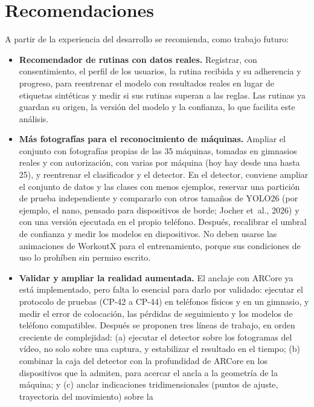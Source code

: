 \section{Recomendaciones}
\label{sec:recomendaciones}

A partir de la experiencia del desarrollo se recomienda, como trabajo futuro:

\begin{itemize}
    \item \textbf{Recomendador de rutinas con datos reales.} Registrar, con
    consentimiento, el perfil de los usuarios, la rutina recibida y su
    adherencia y progreso, para reentrenar el modelo con resultados reales en
    lugar de etiquetas sintéticas y medir si sus rutinas superan a las reglas.
    Las rutinas ya guardan su origen, la versión del modelo y la confianza, lo
    que facilita este análisis.
    \item \textbf{Más fotografías para el reconocimiento de máquinas.} Ampliar
    el conjunto con fotografías propias de las 35 máquinas, tomadas en gimnasios
    reales y con autorización, con varias por máquina (hoy hay desde una hasta
    25), y reentrenar el clasificador y el detector. En el detector, conviene ampliar el conjunto de datos y las clases con menos ejemplos, reservar una partición de prueba independiente y compararlo con otros tamaños de YOLO26 (por ejemplo, el nano, pensado para dispositivos de borde; Jocher et~al., 2026) y con una versión ejecutada en el propio teléfono. Después, recalibrar el umbral de confianza y medir los modelos en dispositivos. No deben usarse las animaciones de
    WorkoutX para el entrenamiento, porque sus condiciones de uso lo prohíben
    sin permiso escrito.
    \item \textbf{Validar y ampliar la realidad aumentada.} El anclaje con
    ARCore ya está implementado, pero falta lo esencial para darlo por
    validado: ejecutar el protocolo de pruebas (CP-42 a CP-44) en teléfonos
    físicos y en un gimnasio, y medir el error de colocación, las pérdidas de
    seguimiento y los modelos de teléfono compatibles. Después se proponen tres
    líneas de trabajo, en orden creciente de complejidad: (a) ejecutar el
    detector sobre los fotogramas del vídeo, no solo sobre una captura, y
    estabilizar el resultado en el tiempo; (b) combinar la caja del detector
    con la profundidad de ARCore en los dispositivos que la admiten, para
    acercar el ancla a la geometría de la máquina; y (c) anclar indicaciones
    tridimensionales (puntos de ajuste, trayectoria del movimiento) sobre la

\end{itemize}
